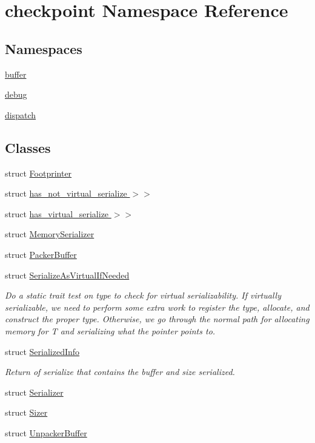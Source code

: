 \hypertarget{namespacecheckpoint}{}\section{checkpoint Namespace Reference}
\label{namespacecheckpoint}
\subsection*{Namespaces}
\begin{DoxyCompactItemize}
\item 
 \hyperlink{namespacecheckpoint_1_1buffer}{buffer}
\item 
 \hyperlink{namespacecheckpoint_1_1debug}{debug}
\item 
 \hyperlink{namespacecheckpoint_1_1dispatch}{dispatch}
\end{DoxyCompactItemize}
\subsection*{Classes}
\begin{DoxyCompactItemize}
\item 
struct \hyperlink{structcheckpoint_1_1_footprinter}{Footprinter}
\item 
struct \hyperlink{structcheckpoint_1_1_serialize_as_virtual_if_needed_3_01_t_00_01_serializer_t_00_01typename_01ste0ab63605b3e36d6a7ee0eb174e8062f}{has\+\_\+not\+\_\+virtual\+\_\+serialize $>$$>$}
\item 
struct \hyperlink{structcheckpoint_1_1_serialize_as_virtual_if_needed_3_01_t_00_01_serializer_t_00_01typename_01std432a7e382b83cd966ec84657915841f}{has\+\_\+virtual\+\_\+serialize $>$$>$}
\item 
struct \hyperlink{structcheckpoint_1_1_memory_serializer}{Memory\+Serializer}
\item 
struct \hyperlink{structcheckpoint_1_1_packer_buffer}{Packer\+Buffer}
\item 
struct \hyperlink{structcheckpoint_1_1_serialize_as_virtual_if_needed}{Serialize\+As\+Virtual\+If\+Needed}
\begin{DoxyCompactList}\small\item\em Do a static trait test on type to check for virtual serializability. If virtually serializable, we need to perform some extra work to register the type, allocate, and construct the proper type. Otherwise, we go through the normal path for allocating memory for T and serializing what the pointer points to. \end{DoxyCompactList}\item 
struct \hyperlink{structcheckpoint_1_1_serialized_info}{Serialized\+Info}
\begin{DoxyCompactList}\small\item\em Return of serialize that contains the buffer and size serialized. \end{DoxyCompactList}\item 
struct \hyperlink{structcheckpoint_1_1_serializer}{Serializer}
\item 
struct \hyperlink{structcheckpoint_1_1_sizer}{Sizer}
\item 
struct \hyperlink{structcheckpoint_1_1_unpacker_buffer}{Unpacker\+Buffer}
\end{DoxyCompactItemize}
